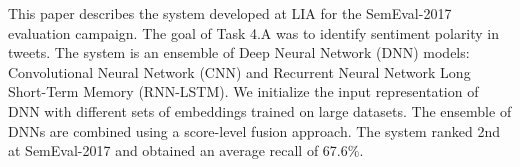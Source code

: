 This paper describes the system developed at LIA for the SemEval-2017 evaluation campaign. The goal of Task 4.A was to identify sentiment polarity in tweets. The system is an ensemble of Deep Neural Network (DNN) models: Convolutional Neural Network (CNN) and Recurrent Neural Network Long Short-Term Memory (RNN-LSTM). We initialize the input representation of DNN with different sets of embeddings trained on large datasets. The ensemble of DNNs are combined using a score-level fusion approach. The system ranked 2nd at SemEval-2017 and obtained an average recall of 67.6\%.
